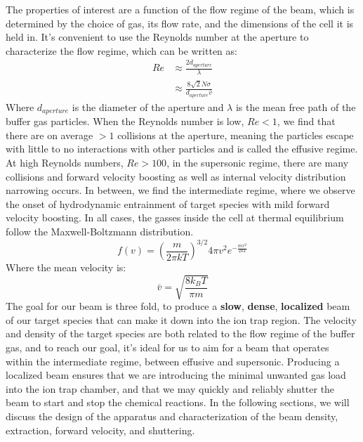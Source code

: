 The properties of interest are a function of the flow regime of the beam, which is determined by the choice of gas, its flow rate, and the dimensions of the cell it is held in. It's convenient to use the Reynolds number at the aperture to characterize the flow regime, which can be written as:
\begin{align}
	Re & \approx \frac{2 d_{aperture}}{\lambda} \nonumber \\
	& \approx \frac{8\sqrt{2} \dot{N} \sigma}{d_{aperture} \bar{v}} \label{eq: reynolds}
\end{align}
Where $d_{aperture}$ is the diameter of the aperture and $\lambda$ is the mean free path of the buffer gas particles.\cite{Hutzler2012} When the Reynolds number is low, $Re<1$, we find that there are on average $>1$ collisions at the aperture, meaning the particles escape with little to no interactions with other particles and is called the effusive regime. At high Reynolds numbers, $Re>100$, in the supersonic regime, there are many collisions and forward velocity boosting as well as internal velocity distribution narrowing occurs. In between, we find the intermediate regime, where we observe the onset of hydrodynamic entrainment of target species with mild forward velocity boosting. In all cases, the gasses inside the cell at thermal equilibrium follow the Maxwell-Boltzmann distribution.
\begin{equation}
	f(v) = \left(\frac{m}{2 \pi k T}\right)^{3/2}4 \pi v^2 e^{-\frac{m v^2}{2 k T}}
	\label{eq: mb_distribution}
\end{equation}
Where the mean velocity is:
\begin{equation}
	\bar{v} = \sqrt{\frac{8 k_B T}{\pi m}}
	\label{eq: mb_mean}
\end{equation}
The goal for our beam is three fold, to produce a \textbf{slow}, \textbf{dense}, \textbf{localized} beam of our target species that can make it down into the ion trap region. The velocity and density of the target species are both related to the flow regime of the buffer gas, and to reach our goal, it's ideal for us to aim for a beam that operates within the intermediate regime, between effusive and supersonic. Producing a localized beam ensures that we are introducing the minimal unwanted gas load into the ion trap chamber, and that we may quickly and reliably shutter the beam to start and stop the chemical reactions. In the following sections, we will discuss the design of the apparatus and characterization of the beam density, extraction, forward velocity, and shuttering.